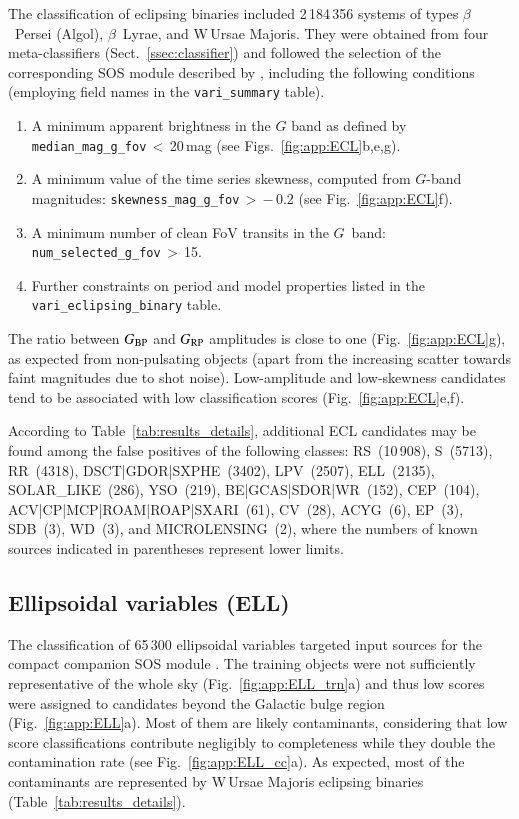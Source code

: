 \documentclass[longauth]{aa}
\def\g{$G$\xspace}
\def\bp{$G_{\rm BP}$\xspace}
\def\rp{$G_{\rm RP}$\xspace}
\begin{document}
The classification of eclipsing binaries included 2\,184\,356 systems of types $\beta$~Persei (Algol), $\beta$~Lyrae, and W\,Ursae Majoris. They were obtained from four meta-classifiers (Sect.~\ref{ssec:classifier}) and followed the selection of the corresponding SOS module described by \citet{DR3-DPACP-170}, including the following  conditions (employing field names in the \texttt{vari\_summary} table).
\begin{enumerate}
\item A minimum apparent brightness in the \g band as defined by  \texttt{median\_mag\_g\_fov}\,$<$\,20\,mag (see Figs.~\ref{fig:app:ECL}b,e,g).
\item A minimum value of the time series skewness, computed from \g-band magnitudes: \texttt{skewness\_mag\_g\_fov}\,$>$\,$-$\,0.2 (see Fig.~\ref{fig:app:ECL}f).
\item A minimum number of clean FoV transits in the \g~band: \texttt{num\_selected\_g\_fov}\,$>$\,15.
\item Further constraints on period and model properties listed in the \texttt{vari\_eclipsing\_binary} table.
\end{enumerate}

The ratio between \bp and \rp amplitudes is close to one (Fig.~\ref{fig:app:ECL}g), as expected from non-pulsating objects (apart from the increasing scatter towards faint magnitudes due to shot noise).
Low-amplitude and low-skewness candidates tend to be associated with low classification scores (Fig.~\ref{fig:app:ECL}e,f). 

According to Table~\ref{tab:results_details}, additional ECL candidates may be found among the false positives of the following classes: RS~(10\,908), S~(5713), RR~(4318), DSCT|GDOR|SXPHE~(3402), LPV~(2507), ELL~(2135), SOLAR\_LIKE~(286),  YSO~(219), BE|GCAS|SDOR|WR~(152), CEP~(104),  ACV|CP|MCP|ROAM|ROAP|SXARI~(61), CV~(28), ACYG~(6), EP~(3), SDB~(3), WD~(3), and MICROLENSING~(2), where the numbers of known sources indicated in parentheses represent lower limits.


\subsection{Ellipsoidal variables (ELL)\label{ssec:ell}}

The classification of 65\,300 ellipsoidal variables targeted input sources for the compact companion SOS module \citep{DR3-DPACP-174}. 
The training objects were not sufficiently representative of the whole sky (Fig.~\ref{fig:app:ELL_trn}a) and thus low scores were assigned to candidates beyond the Galactic bulge region (Fig.~\ref{fig:app:ELL}a). Most of them are likely contaminants, considering that low score classifications contribute negligibly to completeness while they double the contamination rate (see Fig.~\ref{fig:app:ELL_cc}a). As expected, most of the contaminants are represented by W\,Ursae Majoris eclipsing binaries (Table~\ref{tab:results_details}).
\end{document}
